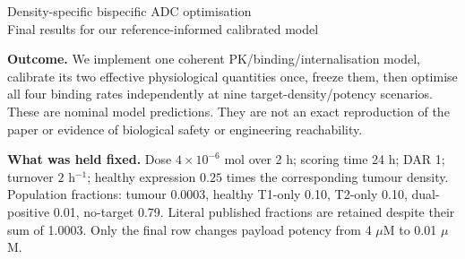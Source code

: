 \documentclass[10pt,a4paper]{article}
\begin{document}
\begin{center}\Large Density-specific bispecific ADC optimisation\\[3pt]
\normalsize Final results for our reference-informed calibrated model\end{center}
\textbf{Outcome.} We implement one coherent PK/binding/internalisation model, calibrate its two effective physiological quantities once, freeze them, then optimise all four binding rates independently at nine target-density/potency scenarios. These are nominal model predictions. They are not an exact reproduction of the paper or evidence of biological safety or engineering reachability.

\textbf{What was held fixed.} Dose $4\times10^{-6}$ mol over 2 h; scoring time 24 h; DAR 1; turnover $2$ h$^{-1}$; healthy expression $0.25$ times the corresponding tumour density. Population fractions: tumour 0.0003, healthy T1-only 0.10, T2-only 0.10, dual-positive 0.01, no-target 0.79. Literal published fractions are retained despite their sum of 1.0003. Only the final row changes payload potency from 4 $\mu$M to 0.01 $\mu$M.
\end{document}
